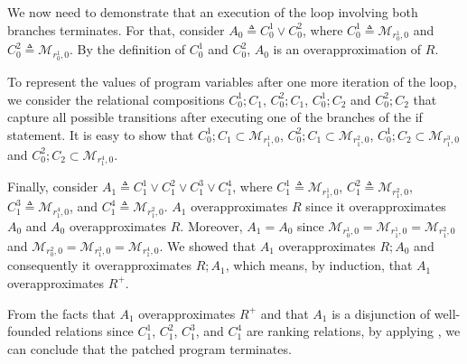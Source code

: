 We now need to demonstrate that an execution of the loop involving both branches terminates. For that, consider $A_0 \triangleq C_0^1 \vee C_0^2$, where $C_0^1 \triangleq \mathcal{M}_{r_0^1,0}$ and $C_0^2 \triangleq \mathcal{M}_{r_0^1,0}$. By the definition of $C_0^1$ and $C_0^2$, $A_0$ is an overapproximation of $R$.

To represent the values of program variables after one more iteration of the loop, we consider the relational compositions $C_0^1; C_1$, $C_0^2; C_1$, $C_0^1; C_2$ and $C_0^2; C_2$ that capture all possible transitions after executing one of the branches of the if statement. It is easy to show that $C_0^1; C_1 \subset \mathcal{M}_{r_1^1,0}$, $C_0^2; C_1 \subset \mathcal{M}_{r_1^2,0}$, $C_0^1; C_2 \subset \mathcal{M}_{r_1^3,0}$ and $C_0^2; C_2 \subset \mathcal{M}_{r_1^4,0}$.

Finally, consider $A_1 \triangleq C_1^1 \vee C_1^2 \vee C_1^3 \vee C_1^4$, where $C_1^1 \triangleq \mathcal{M}_{r_1^1,0}$, $C_1^2 \triangleq \mathcal{M}_{r_1^2,0}$, $C_1^3 \triangleq \mathcal{M}_{r_1^4,0}$, and $C_1^4 \triangleq \mathcal{M}_{r_1^2,0}$. $A_1$ overapproximates $R$ since it overapproximates $A_0$ and $A_0$ overapproximates $R$. Moreover, $A_1 = A_0$ since $\mathcal{M}_{r_0^1,0} = \mathcal{M}_{r_1^1,0} = \mathcal{M}_{r_1^2,0}$ and $\mathcal{M}_{r_0^2,0} = \mathcal{M}_{r_1^3,0} = \mathcal{M}_{r_1^4,0}$. We showed that $A_1$ overapproximates $R;A_0$ and consequently it overapproximates $R;A_1$, which means, by induction, that $A_1$ overapproximates $R^+$.

From the facts that $A_1$ overapproximates $R^+$ and that $A_1$ is a disjunction of well-founded relations since $C_1^1$, $C_1^2$, $C_1^3$, and $C_1^4$ are ranking relations, by applying , we can conclude that the patched program terminates.



